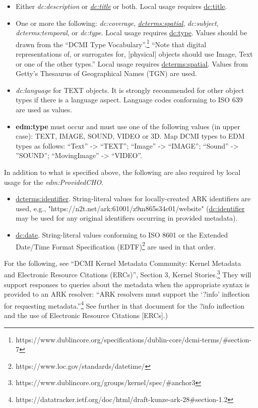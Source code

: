 \documentclass[11pt]{article}
\begin{document}
\begin{itemize}

  \item Either \textit{dc:description} or \underline{\textit{dc:title}} or both. Local usage requires \underline{dc:title}.

  \item One or more the following: \textit{dc:coverage}, \underline{\textit{dcterms:spatial}}, \textit{dc:subject}, \textit{dcterms:temporal}, or \textit{dc:type}. Local usage requires \underline{dc:type}. Values should be drawn from the ``DCMI Type Vocabulary''.\footnote{https://www.dublincore.org/specifications/dublin-core/dcmi-terms/\#section-7} ``Note that digital representations of, or surrogates for, [physical] objects should use Image, Text or one of the other types.'' Local usage requires \underline{dcterms:spatial}. Values from Getty's Thesaurus of Geographical Names (TGN) are used.

  \item \textit{dc:language} for TEXT objects. It is strongly recommended for other object types if there is a language aspect. Language codes conforming to ISO 639 are used as values.

  \item \textbf{edm:type} must occur and must use one of the following values (in upper case): TEXT, IMAGE, SOUND, VIDEO or 3D. Map DCMI types to EDM types as follows: ``Text'' -> ``TEXT''; ``Image'' -> ``IMAGE''; ``Sound'' -> ''SOUND''; ``MovingImage'' -> ``VIDEO''. 
\end{itemize}

In addition to what is specified above, the following are also required by local usage for the \textit{edm:ProvidedCHO}.
\begin{itemize}
  \item \underline{dcterms:identifier}. String-literal values for locally-created ARK identifiers are used, e.g., "https://n2t.net/ark:61001/z9m865s34c01/website" (\underline{dc:identifier} may be used for any original identifiers occurring in provided metadata).

  \item \underline{dc:date}. String-literal values conforming to ISO 8601 or the Extended Date/Time Format Specification (EDTF)\footnote{https://www.loc.gov/standards/datetime/} are used in that order.

\end{itemize}

For the following, see ``DCMI Kernel Metadata Community: Kernel Metadata and Electronic Resource Citations (ERCs)'', Section 3, Kernel Stories.\footnote{https://www.dublincore.org/groups/kernel/spec/\#anchor3} They will support responses to queries about the metadata when the appropriate syntax is provided to an ARK resolver: ``ARK resolvers must support the `?info' inflection for requesting metadata.''\footnote{https://datatracker.ietf.org/doc/html/draft-kunze-ark-28\#section-1.2} See further in that document for the ?info inflection and the use of Electronic Resource Citations [ERCs].)
\end{document}
